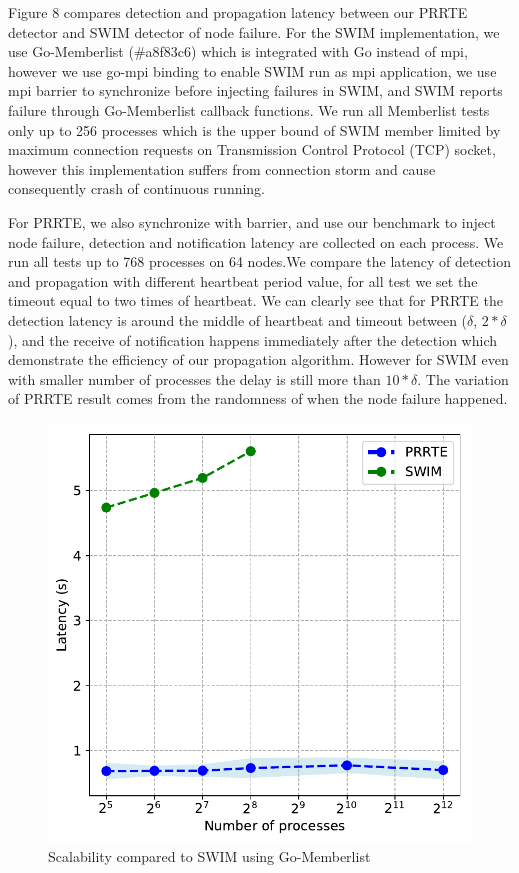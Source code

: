 \documentclass[sigconf]{acmart}
\newcommand{\prrte}[0]{\textsc{PRRTE}\xspace}
\begin{document}
Figure 8 compares detection and propagation latency between our \prrte detector and SWIM detector of node failure. For the SWIM implementation, we use Go-Memberlist (\#a8f83c6) which is integrated with Go instead of mpi, however we use go-mpi binding to enable SWIM run as mpi application, we use mpi barrier to synchronize before injecting failures in SWIM, and SWIM reports failure through Go-Memberlist callback functions. We run all Memberlist tests only up to 256 processes which is the upper bound of SWIM member limited by maximum connection requests on Transmission Control Protocol (TCP) socket, however this implementation suffers from connection storm and cause consequently crash of continuous running. 

For \prrte, we also synchronize with barrier, and use our benchmark to inject node failure, detection and notification latency are collected on each process. We run all tests up to 768 processes on 64 nodes.We compare the latency of detection and propagation with different heartbeat period value, for all test we set the timeout equal to two times of heartbeat. We can clearly see that for \prrte the detection latency is around the middle of heartbeat and timeout between ($\delta$, $2*\delta$), and the receive of notification happens immediately after the detection which demonstrate the efficiency of our propagation algorithm. However for SWIM even with smaller number of processes the delay is still more than $10*\delta$. The variation of \prrte result comes from the randomness of when the node failure happened.

\begin{figure}[h]
  \centering
  \includegraphics[width=\linewidth]{Scale_prrte_swim.pdf}
  \caption{Scalability compared to SWIM using Go-Memberlist}
\end{figure}
\end{document}
